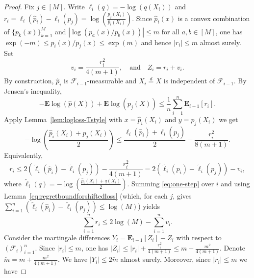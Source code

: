 \documentclass[11pt]{article}
\newcommand{\E}{{\mathbf E}}
\renewcommand{\le}{\leqslant}
\renewcommand{\tilde}{\widetilde}
\theoremstyle{definition}
\theoremstyle{remark}
\begin{document}
\begin{proof}
Fix $j\in[M]$. Write $\ell_i(q)=-\log\left(q\left(X_i\right)\right)$ and $r_i=\ell_i\left(\widehat p_i\right)-\ell_i\left(p_j\right)=\log\left(\frac{p_j\left(X_i\right)}{\widehat p_i\left(X_i\right)}\right)$. Since $\widehat p_i\left(x\right)$ is a convex combination of $\{p_k\left(x\right)\}_{k=1}^M$ and $\left|\log\left(p_a\left(x\right)/p_b\left(x\right)\right)\right|\le m$ for all $a,b \in [M]$, one has $\exp(-m)\le \widehat p_i\left(x\right)/p_j\left(x\right)\le \exp(m)$ and hence $\left|r_i\right|\le m$ almost surely. Set
\[
v_i=\frac{r_i^2}{4\left(m+1\right)},\quad \textrm{and} \quad Z_i=r_i+v_i.
\]
By construction, $\widehat p_i$ is $\mathcal F_{i-1}$-measurable and $X_i\stackrel{d}{=}X$ is independent of $\mathcal F_{i-1}$. By Jensen's inequality,
\begin{equation}\label{eq:risk-mart}
-\E\log\left(\widehat p(X)\right)+\E\log\left(p_j(X)\right)\le \frac{1}{n}\sum_{i=1}^{n}\E_{i-1}\left[ r_i\right].
\end{equation}
Apply Lemma~\ref{lem:logloss-Tstyle} with $x=\widehat p_i\left(X_i\right)$ and $y=p_j\left(X_i\right)$ we get
\[
-\log\left(\frac{\widehat p_i\left(X_i\right)+p_j\left(X_i\right)}{2}\right)\le \frac{\ell_i\left(\widehat p_i\right)+\ell_i\left(p_j\right)}{2}-\frac{r_i^2}{8\left(m+1\right)}.
\]
Equivalently,
\begin{equation}\label{eq:one-step}
r_i\le 2\left(\tilde\ell_i\left(\widehat p_i\right)-\tilde\ell_i\left(p_j\right)\right)-\frac{r_i^2}{4\left(m+1\right)}=2\left(\tilde\ell_i\left(\widehat p_i\right)-\tilde\ell_i\left(p_j\right)\right)-v_i,
\end{equation}
where $\tilde\ell_i\left(q\right)=-\log\left(\frac{\widehat p_i\left(X_i\right)+q\left(X_i\right)}{2}\right)$. Summing \eqref{eq:one-step} over $i$ and using Lemma~\ref{eq:regretboundforshiftedloss} (which, for each $j$, gives $\sum_{i=1}^{n}\left(\tilde\ell_i\left(\widehat p_i\right)-\tilde\ell_i\left(p_j\right)\right)\le \log\left(M\right)$) yields
\begin{equation}\label{eq:sum-r}
\sum_{i=1}^{n}r_i\le 2\log\left(M\right)-\sum_{i=1}^{n}v_i.
\end{equation}
Consider the martingale differences $Y_i=\E_{i-1}\left[Z_i\right]-Z_i$ with respect to $\left(\mathcal F_i\right)_{i=1}^{n}$. Since $\left|r_i\right|\le m$, one has $\left|Z_i\right|\le \left|r_i\right|+\frac{r_i^2}{4\left(m+1\right)}\le m+\frac{m^2}{4\left(m+1\right)}$. Denote $\widetilde{m} = m+\frac{m^2}{4\left(m+1\right)}$. We have $\left|Y_i\right|\le 2\widetilde{m}$ almost surely. Moreover, since $|r_i|\le m$ we have

\end{proof}
\end{document}
